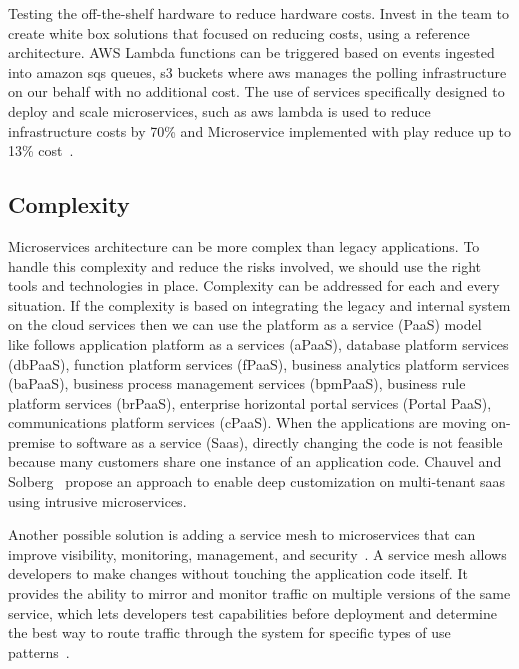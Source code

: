 \par Testing the off-the-shelf hardware to reduce hardware costs. Invest in the team to create white box solutions that focused on reducing costs, using a reference architecture. AWS Lambda functions can be triggered based on events ingested into amazon sqs queues, s3 buckets where aws manages the polling infrastructure on our behalf with no additional cost\cite{Ndungu2019, Zhang2019, Koschel2017}. The use of services specifically designed to deploy and scale microservices, such as aws lambda is used to reduce infrastructure costs by 70\% and Microservice implemented with play reduce up to 13\% cost~\cite{villamizar2017}.

\subsection{Complexity}%
Microservices architecture can be more complex than legacy applications. To handle this complexity and reduce the risks involved, we should use the right tools and technologies in place. 
Complexity can be addressed for each and every situation. If the complexity is based on integrating the legacy and internal system on the cloud services then we can use the platform as a service (PaaS) model~\cite{rosa2018} like follows application platform as a services (aPaaS), database platform services (dbPaaS), function platform services (fPaaS), business analytics platform services (baPaaS), business process management services (bpmPaaS), business rule platform services (brPaaS), enterprise horizontal portal services (Portal PaaS), communications platform services (cPaaS). When the applications are moving on-premise to software as a service (Saas), directly changing the code is not feasible because many customers share one instance of an application code. 
%
Chauvel and Solberg~\cite{chauvel2018} propose an approach to enable deep customization on multi-tenant saas using intrusive microservices.
%
\par Another possible solution is adding a service mesh to microservices that can improve visibility, monitoring, management, and security~\cite{Zaytev2018, Ndungu2019}. A service mesh allows developers to make changes without touching the application code itself. It provides the ability to mirror and monitor traffic on multiple versions of the same service, which lets developers test capabilities before deployment and determine the best way to route traffic through the system for specific types of use patterns~\cite{Premchand2018, gozneli2020}.

